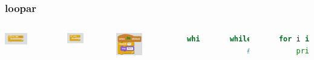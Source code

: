 \documentclass{beamer}
\begin{document}
\begin{frame}[fragile]
	\frametitle{loopar}

	\begin{columns}[c] %
    	\begin{center}
     		\includegraphics[width=0.45\textwidth]{blocks/while.png}
     	\end{center}
     	\begin{center}
     	     \includegraphics[width=0.45\textwidth]{blocks/while_true.png}
     	\end{center}
     	\begin{center}
     	     \includegraphics[width=0.45\textwidth]{blocks/for_10.png}
     	\end{center}

		\begin{lstlisting}[language=Python]
while():
	#kod
		\end{lstlisting}
		\
		
		\begin{lstlisting}[language=Python]
while(True):
	#kod
		\end{lstlisting}
		\
		
		\begin{lstlisting}[language=Python]
for i in range(10):
	print("Hello!")
		\end{lstlisting}
    \end{columns}
\end{frame}
\end{document}
